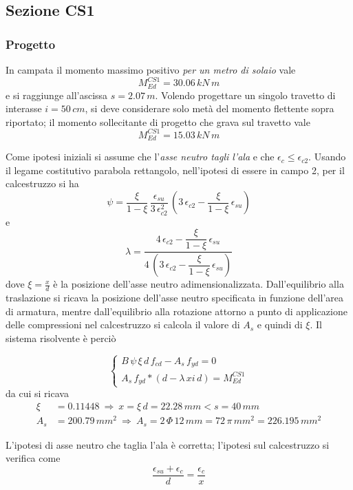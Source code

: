 \subsection{Sezione CS1}\label{sec:sezioneCS1}
\subsubsection{Progetto}

In campata il momento massimo positivo \emph{per un metro di solaio} vale
\[
M_{Ed}^{CS1} = 30.06\,kN\,m
\]
e si raggiunge all'ascissa $s = 2.07\,m$. Volendo progettare un singolo travetto di interasse $i=50\,cm$, si deve considerare solo metà del momento flettente sopra riportato; il momento sollecitante di progetto che grava sul travetto vale
\[
M_{Ed}^{CS1} = 15.03\,kN\,m
\]

Come ipotesi iniziali si assume che l'\emph{asse neutro tagli l'ala} e che $\epsilon_c \leq \epsilon_{c2}$. Usando il legame costitutivo parabola rettangolo, nell'ipotesi di essere in campo 2, per il calcestruzzo si ha
\[
\psi = \dfrac{\xi}{1-\xi}\,\dfrac{\epsilon_{su}}{3\,\epsilon_{c2}^2}\,\left(3\,\epsilon_{c2} - \dfrac{\xi}{1-\xi}\,\epsilon_{su}\right)
\]
e
\[
\lambda = \dfrac{4\,\epsilon_{c2} - \dfrac{\xi}{1-\xi}\,\epsilon_{su}}{4\,\left(3\,\epsilon_{c2}-\dfrac{\xi}{1-\xi}\,\epsilon_{su}\right)}
\]
dove $\xi = \frac{x}{d}$ è la posizione dell'asse neutro adimensionalizzata. Dall'equilibrio alla traslazione si ricava la posizione dell'asse neutro specificata in funzione dell'area di armatura, mentre dall'equilibrio alla rotazione attorno a punto di applicazione delle compressioni nel calcestruzzo si calcola il valore di $A_s$ e quindi di $\xi$. Il sistema risolvente è perciò

\[
\begin{cases}
	B\,\psi\,\xi\,d\,f_{cd} - A_s\,f_{yd}= 0\\
	A_s\,f_{yd}*(d - \lambda\,xi\,d) = M_{Ed}^{CS1}
\end{cases}
\]
da cui si ricava
\begin{align*}
    \xi &= 0.11448~\Longrightarrow~x = \xi\,d = 22.28\,mm < s = 40\,mm\\
	A_s &= 200.79\,mm^2~\Longrightarrow~A_s = 2\,\Phi\,12\,mm = 72\,\pi\,mm^2 = 226.195\,mm^2
\end{align*}

L'ipotesi di asse neutro che taglia l'ala è corretta; l'ipotesi sul calcestruzzo si verifica come
\[
\dfrac{\epsilon_{su} + \epsilon_c}{d} = \dfrac{\epsilon_c}{x}
\]

